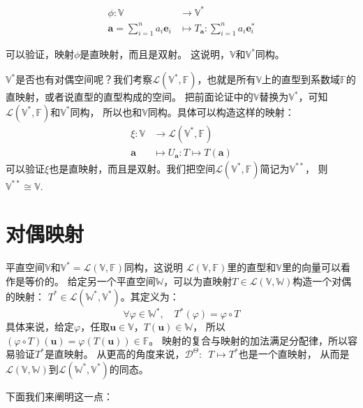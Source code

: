 \documentclass[12pt,UTF8]{ctexbook}
\begin{document}
\begin{align*} 
    \phi : \mathbb{V} &\rightarrow \mathbb{V}^*  \\
    \mathbf{a} = \sum_{i=1}^n a_i \mathbf{e}_i &\mapsto  T_{\mathbf{a}} : \sum_{i=1}^n a_i \mathbf{e}_i^* 
\end{align*}

可以验证，映射$\phi$是直映射，而且是双射。
这说明，$\mathbb{V}$和$\mathbb{V}^*$同构。

$\mathbb{V}^*$是否也有对偶空间呢？我们考察$\mathcal{L}(\mathbb{V}^*, \mathbb{F})$，也就是所有$\mathbb{V}$上的直型到系数域$\mathbb{F}$的直映射，或者说直型的直型构成的空间。
把前面论证中的$\mathbb{V}$替换为$\mathbb{V}^*$，可知$\mathcal{L}(\mathbb{V}^*, \mathbb{F})$和$\mathbb{V}^*$同构，
所以也和$\mathbb{V}$同构。具体可以构造这样的映射：
\begin{align*} 
    \xi : \mathbb{V} &\rightarrow \mathcal{L}(\mathbb{V}^*, \mathbb{F}) \\
    \mathbf{a}  &\mapsto  U_{\mathbf{a}} : T\mapsto T({\mathbf{a}}) 
\end{align*}
可以验证$\xi$也是直映射，而且是双射。我们把空间$\mathcal{L}(\mathbb{V}^*, \mathbb{F})$简记为$\mathbb{V}^{**}$，
则$\mathbb{V}^{**}\cong\mathbb{V}.$

\section{对偶映射}

平直空间$\mathbb{V}$和$\mathbb{V}^* = \mathcal{L}(\mathbb{V}, \mathbb{F})$同构，这说明
$\mathcal{L}(\mathbb{V}, \mathbb{F})$里的直型和$\mathbb{V}$里的向量可以看作是等价的。
给定另一个平直空间$ \mathbb{W}$，可以为直映射$T \in \mathcal{L}(\mathbb{V}, \mathbb{W})$构造一个对偶的映射：
$T^* \in \mathcal{L}(\mathbb{W}^*, \mathbb{V}^*)$。其定义为：
$$ \forall \varphi \in \mathbb{W}^*, \quad T^*(\varphi) = \varphi \circ T $$
具体来说，给定$\varphi$，任取$\mathbf{u} \in \mathbb{V}$，$T(\mathbf{u}) \in \mathbb{W}$，
所以$(\varphi \circ T)(\mathbf{u}) = \varphi(T(\mathbf{u}))\in \mathbb{F}$。
映射的复合与映射的加法满足分配律，所以容易验证$T^*$是直映射。
从更高的角度来说，$\mathcal{D}^{\Theta}:\,\,\, T \mapsto T^*$也是一个直映射，
从而是$\mathcal{L}(\mathbb{V}, \mathbb{W})$到$\mathcal{L}(\mathbb{W}^*, \mathbb{V}^*)$的同态。

下面我们来阐明这一点：
\end{document}
